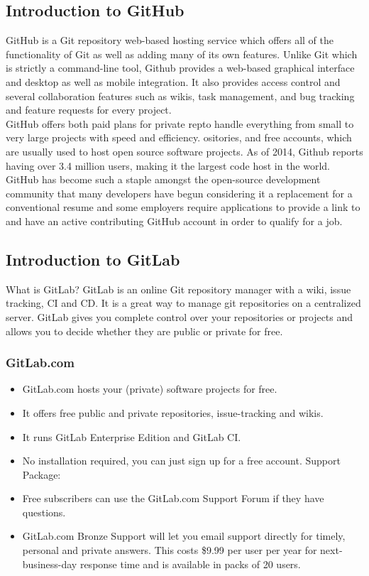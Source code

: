 \subsection{Introduction to GitHub}
\noindent GitHub is a Git repository web-based hosting service which offers all of the functionality of Git as well as adding many of its own features. Unlike Git which is strictly a command-line tool, Github provides a web-based graphical interface and desktop as well as mobile integration. It also provides access control and several collaboration features such as wikis, task management, and bug tracking and feature requests for every project.\\

\noindent GitHub offers both paid plans for private repto handle everything from small to very large projects with speed and efficiency. ositories, and free accounts, which are usually used to host open source software projects. As of 2014, Github reports having over 3.4 million users, making it the largest code host in the world.\\

\noindent GitHub has become such a staple amongst the open-source development community that many developers have begun considering it a replacement for a conventional resume and some employers require applications to provide a link to and have an active contributing GitHub account in order to qualify for a job.

\subsection{Introduction to GitLab}
What is GitLab? GitLab is an online Git repository manager with a wiki, issue tracking, CI and CD. It is a great way to manage git repositories on a centralized server. GitLab gives you complete control over your repositories or projects and allows you to decide whether they are public or private for free.

\subsubsection{GitLab.com}
\begin{itemize}
	\item GitLab.com hosts your (private) software projects for free.
	\item It offers free public and private repositories, issue-tracking and wikis.
	\item It runs GitLab Enterprise Edition and GitLab CI.
	\item No installation required, you can just sign up for a free account. Support Package:
	\item Free subscribers can use the GitLab.com Support Forum if they have questions.
	\item GitLab.com Bronze Support will let you email support directly for timely, personal and private answers. This costs \$9.99 per user per year for next-business-day response time and is available in packs of 20 users.
\end{itemize}

